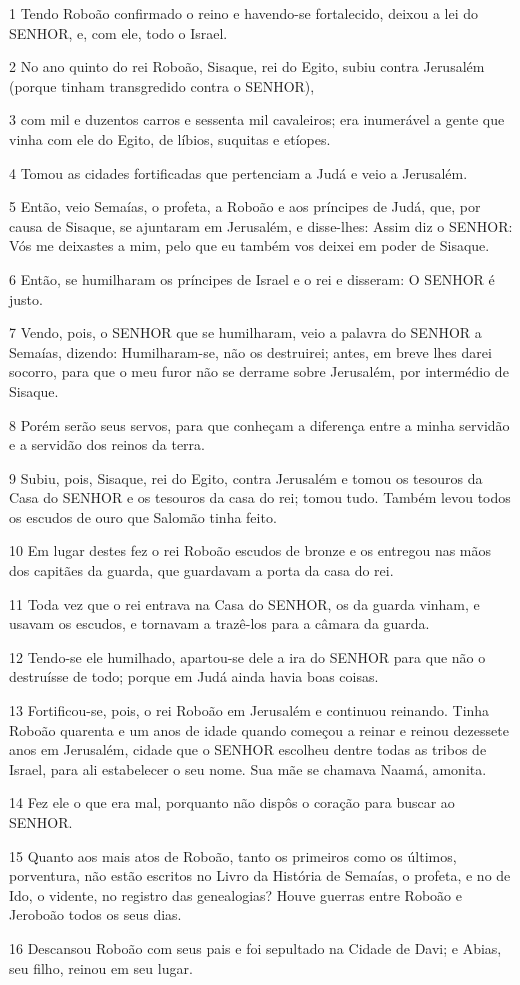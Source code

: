 \par 1 Tendo Roboão confirmado o reino e havendo-se fortalecido, deixou a lei do SENHOR, e, com ele, todo o Israel.
\par 2 No ano quinto do rei Roboão, Sisaque, rei do Egito, subiu contra Jerusalém (porque tinham transgredido contra o SENHOR),
\par 3 com mil e duzentos carros e sessenta mil cavaleiros; era inumerável a gente que vinha com ele do Egito, de líbios, suquitas e etíopes.
\par 4 Tomou as cidades fortificadas que pertenciam a Judá e veio a Jerusalém.
\par 5 Então, veio Semaías, o profeta, a Roboão e aos príncipes de Judá, que, por causa de Sisaque, se ajuntaram em Jerusalém, e disse-lhes: Assim diz o SENHOR: Vós me deixastes a mim, pelo que eu também vos deixei em poder de Sisaque.
\par 6 Então, se humilharam os príncipes de Israel e o rei e disseram: O SENHOR é justo.
\par 7 Vendo, pois, o SENHOR que se humilharam, veio a palavra do SENHOR a Semaías, dizendo: Humilharam-se, não os destruirei; antes, em breve lhes darei socorro, para que o meu furor não se derrame sobre Jerusalém, por intermédio de Sisaque.
\par 8 Porém serão seus servos, para que conheçam a diferença entre a minha servidão e a servidão dos reinos da terra.
\par 9 Subiu, pois, Sisaque, rei do Egito, contra Jerusalém e tomou os tesouros da Casa do SENHOR e os tesouros da casa do rei; tomou tudo. Também levou todos os escudos de ouro que Salomão tinha feito.
\par 10 Em lugar destes fez o rei Roboão escudos de bronze e os entregou nas mãos dos capitães da guarda, que guardavam a porta da casa do rei.
\par 11 Toda vez que o rei entrava na Casa do SENHOR, os da guarda vinham, e usavam os escudos, e tornavam a trazê-los para a câmara da guarda.
\par 12 Tendo-se ele humilhado, apartou-se dele a ira do SENHOR para que não o destruísse de todo; porque em Judá ainda havia boas coisas.
\par 13 Fortificou-se, pois, o rei Roboão em Jerusalém e continuou reinando. Tinha Roboão quarenta e um anos de idade quando começou a reinar e reinou dezessete anos em Jerusalém, cidade que o SENHOR escolheu dentre todas as tribos de Israel, para ali estabelecer o seu nome. Sua mãe se chamava Naamá, amonita.
\par 14 Fez ele o que era mal, porquanto não dispôs o coração para buscar ao SENHOR.
\par 15 Quanto aos mais atos de Roboão, tanto os primeiros como os últimos, porventura, não estão escritos no Livro da História de Semaías, o profeta, e no de Ido, o vidente, no registro das genealogias? Houve guerras entre Roboão e Jeroboão todos os seus dias.
\par 16 Descansou Roboão com seus pais e foi sepultado na Cidade de Davi; e Abias, seu filho, reinou em seu lugar.

